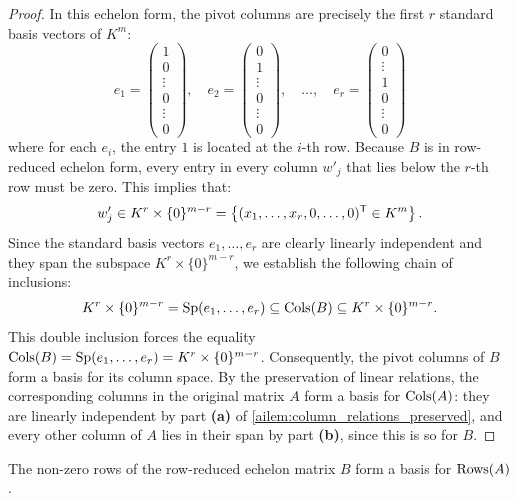 \begin{proof}
In this echelon form, the pivot columns are precisely the first $r$ standard basis vectors of $K^m$:
\[
e_1 = \begin{pmatrix} 1 \\ 0 \\ \vdots \\ 0 \\ \vdots \\ 0 \end{pmatrix}, \quad 
e_2 = \begin{pmatrix} 0 \\ 1 \\ \vdots \\ 0 \\ \vdots \\ 0 \end{pmatrix}, \quad \dots, \quad 
e_r = \begin{pmatrix} 0 \\ \vdots \\ 1 \\ 0 \\ \vdots \\ 0 \end{pmatrix}
\]
where for each $e_i$, the entry $1$ is located at the $i$-th row. Because $B$ is in row-reduced echelon form, every entry in every column $w'_j$ that lies below the $r$-th row must be zero. This implies that:
\[
w'_j \in K^r \times \{0\}^{m-r} = \left\{ (x_1, \dots, x_r, 0, \dots, 0)^{\mathsf{T}} \in K^m \right\}.
\]
Since the standard basis vectors $e_1, \dots, e_r$ are clearly linearly independent and they span the subspace $K^r \times \{0\}^{m-r}$, we establish the following chain of inclusions:
\[
K^r \times \{0\}^{m-r} = \operatorname{Sp}(e_1, \dots, e_r) \subseteq \operatorname{Cols}(B) \subseteq K^r \times \{0\}^{m-r}.
\]
This double inclusion forces the equality $\operatorname{Cols}(B) = \operatorname{Sp}(e_1, \dots, e_r) = K^r \times \{0\}^{m-r}$. Consequently, the pivot columns of $B$ form a basis for its column space. By the preservation of linear relations, the corresponding columns in the original matrix $A$ form a basis for $\operatorname{Cols}(A)$: they are linearly independent by part \textbf{(a)} of \cref{ailem:column_relations_preserved}, and every other column of $A$ lies in their span by part \textbf{(b)}, since this is so for $B$.
\end{proof}

\begin{theorem}
\label{thm:row_basis}
The non-zero rows of the row-reduced echelon matrix $B$ form a basis for $\operatorname{Rows}(A)$.
\end{theorem}

